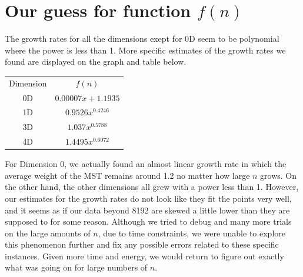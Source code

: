 \documentclass[11pt]{article}
\begin{document}
\section{Our guess for function $f(n)$}
The growth rates for all the dimensions exept for 0D seem to be polynomial where the power is less than 1. More specific estimates of the growth rates we found are displayed on the graph and table below.
\begin{center}
\begin{tabular}{c c}
Dimension & $f(n)$\\
0D & $0.00007x + 1.1935$ \\
1D & $0.9526x^{0.4246}$\\
3D & $1.037x^{0.5788}$\\
4D & $1.4495x^{0.6072}$
\end{tabular}
\end{center}
For Dimension 0, we actually found an almost linear growth rate in which the average weight of the MST remains around 1.2 no matter how large $n$ grows. On the other hand, the other dimensions all grew with a power less than 1. However, our estimates for the growth rates do not look like they fit the points very well, and it seems as if our data beyond 8192 are skewed a little lower than they are supposed to for some reason. Although we tried to debug and many more trials on the large amounts of $n$, due to time constraints, we were unable to explore this phenomenon further and fix any possible errors related to these specific instances. Given more time and energy, we would return to figure out exactly what was going on for large numbers of $n$.
\end{document}
